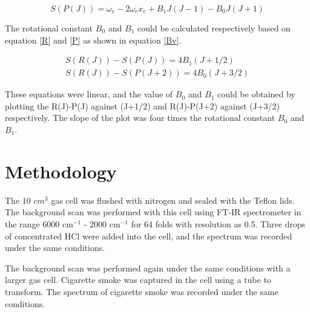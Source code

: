 \documentclass[twocolumn]{article} %
\begin{document}
\begin{equation}
    S(P(J)) = \omega_e - 2\omega_ex_e + B_1J(J-1)-B_0 J(J+1) \label{P}
\end{equation}

The rotational constant $B_0$ and $B_1$ could be calculated respectively based on equation \ref{R} and \ref{P} as shown in equation \ref{Bv}. 

\begin{subequations}
    \label{Bv}
    \begin{gather}
        S(R(J)) - S(P(J)) = 4 B_1(J+1/2) \\
        S(R(J)) - S(P(J+2)) = 4 B_0(J+3/2)
    \end{gather}
\end{subequations}

These equations were linear, and the value of $B_0$ and $B_1$ could be obtained by plotting the R(J)-P(J) against (J+1/2) and R(J)-P(J+2) against (J+3/2) respectively. The slope of the plot was four times the rotational constant $B_0$ and $B_1$.






\section{Methodology}

The 10 $cm^3$ gas cell was flushed with nitrogen and sealed with the Teflon lids. The background scan was performed with this cell using FT-IR spectrometer in the range 6000 cm$^{-1}$ - 2000 cm$^{-1}$ for 64 folds with resolution as 0.5. Three drops of concentrated HCl were added into the cell, and the spectrum was recorded under the same conditions. 

The background scan was performed again under the same conditions with a larger gas cell. Cigarette smoke was captured in the cell using a tube to transform. The spectrum of cigarette smoke was recorded under the same conditions. 
\end{document}
